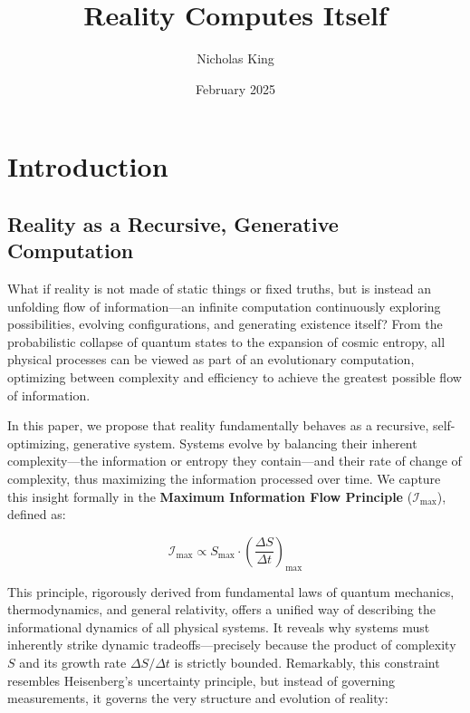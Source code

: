 \documentclass[12pt]{article}
\begin{document}
\title{Reality Computes Itself}
\author{Nicholas King}
\date{February 2025}

\maketitle

\section{Introduction}

\subsection{Reality as a Recursive, Generative Computation}

What if reality is not made of static things or fixed truths, but is instead an unfolding flow of information—an infinite computation continuously exploring possibilities, evolving configurations, and generating existence itself? From the probabilistic collapse of quantum states to the expansion of cosmic entropy, all physical processes can be viewed as part of an evolutionary computation, optimizing between complexity and efficiency to achieve the greatest possible flow of information.

In this paper, we propose that reality fundamentally behaves as a recursive, self-optimizing, generative system. Systems evolve by balancing their inherent complexity—the information or entropy they contain—and their rate of change of complexity, thus maximizing the information processed over time. We capture this insight formally in the \textbf{Maximum Information Flow Principle} ($\mathcal{I}_{\text{max}}$), defined as:

\begin{equation}
    \mathcal{I}_{\text{max}} \propto S_{\text{max}} \cdot \left(\frac{\Delta S}{\Delta t}\right)_{\text{max}}
\end{equation}

This principle, rigorously derived from fundamental laws of quantum mechanics, thermodynamics, and general relativity, offers a unified way of describing the informational dynamics of all physical systems. It reveals why systems must inherently strike dynamic tradeoffs—precisely because the product of complexity \( S \) and its growth rate \(\Delta S / \Delta t\) is strictly bounded. Remarkably, this constraint resembles Heisenberg's uncertainty principle, but instead of governing measurements, it governs the very structure and evolution of reality:
\end{document}
